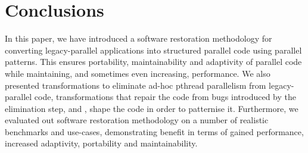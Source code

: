 \section{Conclusions} \label{sec:Conclusions} 
In this paper, we have introduced a software restoration methodology for converting legacy-parallel applications into structured parallel code using parallel patterns. This ensures portability, maintainability and adaptivity of parallel code while maintaining, and sometimes even increasing, performance. We also presented transformations to eliminate ad-hoc pthread parallelism from legacy-parallel code, transformations that repair the code from bugs introduced by the elimination step, and , shape the code in order to patternise it. Furthermore, we evaluated out software restoration methodology on a number of realistic benchmarks and use-cases, demonstrating benefit in terms of gained performance, increased adaptivity, portability and maintainability.






